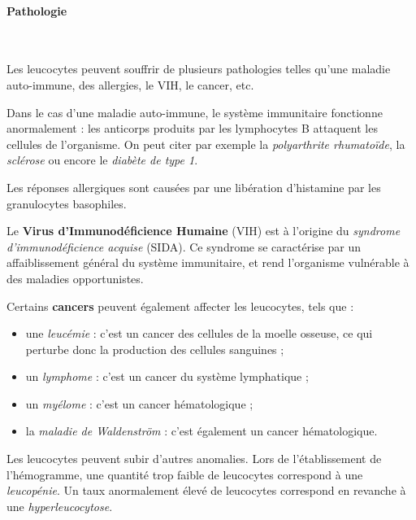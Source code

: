\documentclass[12pt]{article}
\begin{document}
		\paragraph{Pathologie}\mbox{~}
		
	Les leucocytes peuvent souffrir de plusieurs pathologies telles qu'une maladie auto-immune, des allergies, le VIH, le cancer, etc.
	
	Dans le cas d'une maladie auto-immune, le système immunitaire fonctionne anormalement : les anticorps produits par les lymphocytes B attaquent les cellules de l'organisme. On peut citer par exemple la \textit{polyarthrite rhumatoïde}, la \textit{sclérose} ou encore le \textit{diabète de type 1}.
	
	Les réponses allergiques sont causées par une libération d'histamine par les granulocytes basophiles.
	
	Le \textbf{Virus d'Immunodéficience Humaine} (VIH) est à l'origine du \textit{syndrome d'immunodéficience acquise} (SIDA). Ce syndrome se caractérise par un affaiblissement général du système immunitaire, et rend l'organisme vulnérable à des maladies opportunistes.
	
	Certains \textbf{cancers} peuvent également affecter les leucocytes, tels que :
	\begin{itemize}
	\item une \textit{leucémie} : c'est un cancer des cellules de la moelle osseuse, ce qui perturbe donc la production des cellules sanguines ;
	\item un \textit{lymphome} : c'est un cancer du système lymphatique ;
	\item un \textit{myélome} : c'est un cancer hématologique ;
	\item la \textit{maladie de Waldenström} : c'est également un cancer hématologique.
	\end{itemize}
	
	Les leucocytes peuvent subir d'autres anomalies. Lors de l'établissement de l'hémogramme, une quantité trop faible de leucocytes correspond à une \textit{leucopénie}. Un taux anormalement élevé de leucocytes correspond en revanche à une \textit{hyperleucocytose}.
	
\end{document}
